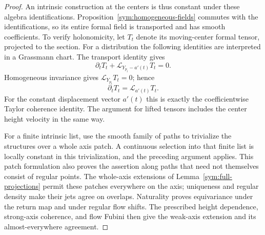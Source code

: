 \begin{proof}
An intrinsic construction at the centers is thus constant under
these algebra identifications.  Proposition~\ref{sym:homogeneous-fields}
commutes with the identifications, so its entire formal field is
transported and has smooth coefficients.  To verify holonomicity,
let $T_t$ denote its moving-center formal tensor, projected to the
section.  For a distribution the following identities are interpreted
in a Grassmann chart.  The transport identity gives
\[
 \partial_t T_t+\mathcal L_{Y_{p_t}-a'(t)}T_t=0.
\]
Homogeneous invariance gives $\mathcal L_{Y_{p_t}}T_t=0$; hence
\[
 \partial_tT_t=\mathcal L_{a'(t)}T_t.
\]
For the constant displacement vector $a'(t)$ this is exactly the
coefficientwise Taylor coherence identity.  The argument for lifted
tensors includes the center height velocity in the same way.

For a finite intrinsic list, use the smooth family of paths to
trivialize the structures over a whole axis patch.  A continuous
selection into that finite list is locally constant in this
trivialization, and the preceding argument applies.  This patch
formulation also proves the assertion along paths that need not
themselves consist of regular points.  The whole-axis extensions of
Lemma~\ref{sym:full-projections} permit these patches everywhere on
the axis; uniqueness and regular density make their jets agree on
overlaps.  Naturality proves equivariance under the return map and
under regular flow shifts.  The prescribed height dependence,
strong-axis coherence, and flow Fubini then give the weak-axis
extension and its almost-everywhere agreement.
\end{proof}
